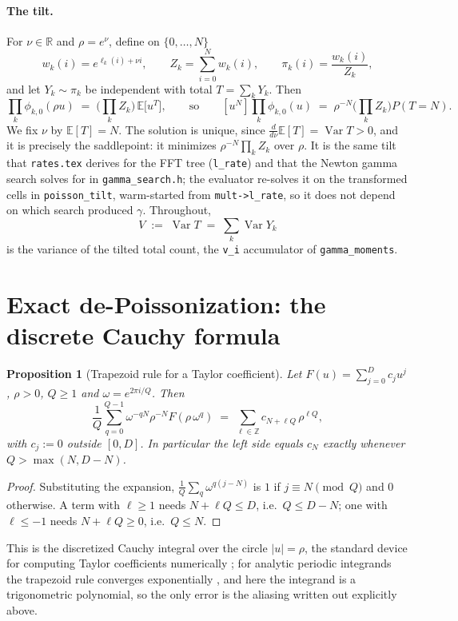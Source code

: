 \documentclass[11pt]{article}
\newtheorem{proposition}{Proposition}
\newcommand{\Var}{\operatorname{Var}}
\newcommand{\coef}[1]{[u^{#1}]}
\begin{document}
\paragraph{The tilt.} For $\nu\in\mathbb R$ and $\rho=e^\nu$, define on $\{0,\dots,N\}$
\[
  w_k(i)=e^{\ell_k(i)+\nu i},\qquad Z_k=\sum_{i=0}^Nw_k(i),\qquad \pi_k(i)=\frac{w_k(i)}{Z_k},
\]
and let $Y_k\sim\pi_k$ be independent with total $T=\sum_kY_k$. Then
\begin{equation}
  \label{eq:pgf}
  \prod_k\phi_{k,0}(\rho u)\;=\;\Big(\prod_kZ_k\Big)\,\mathbb E\big[u^T\big],
  \qquad\text{so}\qquad
  \coef N\prod_k\phi_{k,0}(u)\;=\;\rho^{-N}\Big(\prod_kZ_k\Big)P(T=N).
\end{equation}
We fix $\nu$ by $\mathbb E[T]=N$. The solution is unique, since
$\frac{d}{d\nu}\mathbb E[T]=\Var T>0$, and it is precisely the saddlepoint: it minimizes
$\rho^{-N}\prod_kZ_k$ over $\rho$. It is the same tilt that \texttt{rates.tex} derives for the FFT
tree (\texttt{l\_rate}) and that the Newton gamma search solves for in \texttt{gamma\_search.h}; the
evaluator re-solves it on the transformed cells in \texttt{poisson\_tilt}, warm-started from
\texttt{mult->l\_rate}, so it does not depend on which search produced $\gamma$. Throughout,
\[
  V\;:=\;\Var T\;=\;\sum_k\Var Y_k
\]
is the variance of the tilted total count, the \texttt{v\_i} accumulator of \texttt{gamma\_moments}.

\section{Exact de-Poissonization: the discrete Cauchy formula}
\label{sec:cauchy}

\begin{proposition}[Trapezoid rule for a Taylor coefficient]
\label{prop:cauchy}
Let $F(u)=\sum_{j=0}^{D}c_ju^j$, $\rho>0$, $Q\ge1$ and $\omega=e^{2\pi i/Q}$. Then
\[
  \frac1Q\sum_{q=0}^{Q-1}\omega^{-qN}\rho^{-N}F(\rho\,\omega^q)
  \;=\;\sum_{\ell\in\mathbb Z}c_{N+\ell Q}\,\rho^{\ell Q},
\]
with $c_j:=0$ outside $[0,D]$. In particular the left side equals $c_N$ exactly whenever
$Q>\max(N,D-N)$.
\end{proposition}
\begin{proof}
Substituting the expansion, $\frac1Q\sum_q\omega^{q(j-N)}$ is $1$ if $j\equiv N\pmod Q$ and $0$
otherwise. A term with $\ell\ge1$ needs $N+\ell Q\le D$, i.e.\ $Q\le D-N$; one with $\ell\le-1$ needs
$N+\ell Q\ge0$, i.e.\ $Q\le N$.
\end{proof}

This is the discretized Cauchy integral over the circle $|u|=\rho$, the standard device for
computing Taylor coefficients numerically \citep{lynessmoler1967,bornemann2011}; for analytic
periodic integrands the trapezoid rule converges exponentially \citep{trefethenweideman2014}, and
here the integrand is a trigonometric polynomial, so the only error is the aliasing written out
explicitly above.
\end{document}
